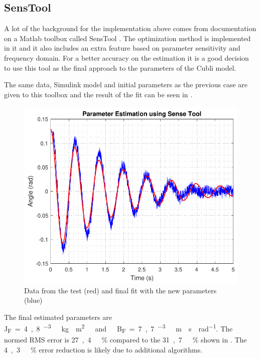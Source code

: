 \subsection{SensTool}
A lot of the background for the implementation above comes from documentation on a Matlab toolbox called SensTool . The optimization method is implemented in it and it also includes an extra feature based on parameter sensitivity and frequency domain. For a better accuracy on the estimation it is a good decision to use this tool as the final approach to the parameters of the Cubli model.

The same data, Simulink model and initial parameters as the previous case are given to this toolbox and the result of the fit can be seen in . 
%
\begin{figure}[H]
	\centering
	\includegraphics[scale=0.6]{figures/SenseToolParameterEstimation}
	\caption{Data from the test (red) and final fit with the new parameters (blue)}
	\label{SenseToolParameterEstimation}
\end{figure}
%

The final estimated parameters are \si{J_F=4,8 ^{-3}\ kg \cdot m^2\ and\ B_F=7,7 ^{-3}\ m \cdot s \cdot rad^{-1}}. The normed RMS error is \si{27,4\ \%} compared to the \si{31,7\ \%} shown in . The \si{4,3\ \%} error reduction is likely due to additional algorithms.

